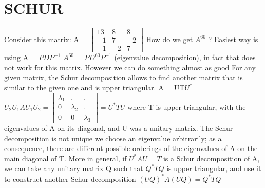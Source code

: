 \documentclass[]{finalproject}
\begin{document}
\section{SCHUR} \label{schur}
\begin{flushleft}
Consider this matrix: \newline \newline
A = $\begin{bmatrix} 
13 & 8 & 8 \\
-1 & 7 & -2 \\
-1 & -2 & 7
\end{bmatrix} $  How do we get $ A^{60} $ ? \newline \newline
Easiest way is using A = $P D P^{-1} $ \qquad $ A^{60}$ = $P D^{60} P^{-1}$ (eigenvalue decomposition), in fact that does not work for this matrix. However we can do something almost as good
For any given matrix, the Schur decomposition allows to find another matrix that is similar to the given one and is upper triangular. \newline \newline
A = UT$U^{*}$ \qquad $ U_{2}U_{1}AU_{1}U_{2} = \begin{bmatrix} 
\lambda_{1} & . & .\\
0 & \lambda_{2} & .\\
0 & 0 & \lambda_{3}
\end{bmatrix} = U^{*}TU$ \newline \newline
where T is upper triangular, with the eigenvalues of A on its diagonal, and U was a unitary matrix. \newline
The Schur decomposition is not unique
we choose an eigenvalue arbitrarily; as a consequence, there are different possible orderings of the eigenvalues of A on the main diagonal of T. \newline
More in general, if \qquad $ U^{*}AU = T $ \qquad is a Schur decomposition of A, we can take any unitary matrix Q such that $ Q^{*}TQ $ \newline
is upper triangular, and use it to construct another Schur decomposition $ (UQ)^{*}A(UQ) = Q^{*}TQ $ \cite{schur} \newline
 

\end{flushleft}
\end{document}
